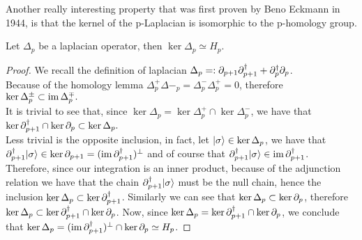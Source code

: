 \documentclass[../1.tex]{subfiles}
\begin{document}
    Another really interesting property that was first proven by Beno Eckmann in 1944, is that the kernel of the p-Laplacian
    is isomorphic to the p-homology group.

    \begin{thm}
        Let $\Delta_p$ be a laplacian operator, then $\ker\Delta_p \simeq H_p$.
    \end{thm}
    \begin{proof}
        We recall the definition of laplacian $\Delta_p =: \partial_{p+1}\partial^\dagger_{p+1} + \partial^\dagger_p\partial_p$.\\
        Because of the homology lemma $\Delta^+_p\Delta-_p = \Delta^-_p\Delta^+_p = 0$, therefore $\ker\Delta^{\pm}_p \subset \mathrm{im}\,\Delta^{\mp}_p.$\\
        It is trivial to see that, since $\ker\Delta_p = \ker\Delta^+_p \cap \ker\Delta^-_p $, we have that $\ker\partial^\dagger_{p+1} \cap \ker\partial_p \subset \ker\Delta_p.$ \\
        Less trivial is the opposite inclusion, in fact, let $| \sigma \rangle \in \ker\Delta_p$, we have that $\partial_{p+1}^\dagger| \sigma \rangle \in \ker\partial_{p+1} = (\mathrm{im}\,\partial_{p+1}^\dagger)^\perp$ 
        and of course that $\partial_{p+1}^\dagger| \sigma \rangle \in \mathrm{im}\,\partial_{p+1}^\dagger$.\\
        Therefore, since our integration is an inner product, because of the adjunction relation we have that the chain $\partial_{p+1}^\dagger| \sigma \rangle$ must
        be the null chain, hence the inclusion $\ker\Delta_p \subset \ker\partial_{p+1}^\dagger$. Similarly we can see that $\ker\Delta_p \subset \ker\partial_p$,        
        therefore $\ker\Delta_p \subset \ker\partial^\dagger_{p+1} \cap \ker\partial_p $. Now, since $\ker\Delta_p = \ker\partial^\dagger_{p+1} \cap \ker\partial_p$, we conclude that 
        $\ker\Delta_p = (\mathrm{im}\,\partial_{p+1}^\dagger)^\perp \cap \ker\partial_p \simeq H_p$. \qedhere
    \end{proof}
\end{document}
